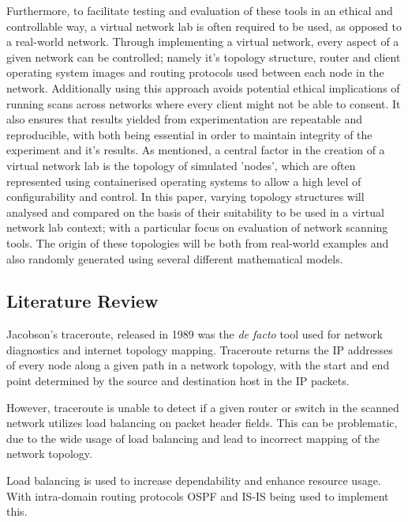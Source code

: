 Furthermore, to facilitate testing and evaluation of these tools in an ethical and controllable way, a virtual network lab is often required to be used, as opposed to a real-world network. Through implementing a virtual network, every aspect of a given network can be controlled; namely it's topology structure, router and client operating system images and routing protocols used between each node in the network. Additionally using this approach avoids potential ethical implications of running scans across networks where every client might not be able to consent. It also ensures that results yielded from experimentation are repeatable and reproducible, with both being essential in order to maintain integrity of the experiment and it's results. As mentioned, a central factor in the creation of a virtual network lab is the topology of simulated 'nodes', which are often represented using containerised operating systems to allow a high level of configurability and control. In this paper, varying topology structures will analysed and compared on the basis of their suitability to be used in a virtual network lab context; with a particular focus on evaluation of network scanning tools. The origin of these topologies will be both from real-world examples and also randomly generated using several different mathematical models. 

\subsection{Literature Review}

Jacobson's traceroute, released in 1989 was the \textit{de facto} tool used for network diagnostics and internet topology mapping.
Traceroute returns the IP addresses of every node along a given path in a network topology, with the start and end point determined by the source and destination host in the IP packets.\cite{jacobson1989traceroute}

However, traceroute is unable to detect if a given router or switch in the scanned network utilizes load balancing on packet header fields. This can be problematic, due to the wide usage of load balancing and lead to incorrect mapping of the network topology.\cite{anomalies}\cite{exhaustive}

Load balancing is used to increase dependability and enhance resource usage. With intra-domain routing protocols OSPF\cite{moyospf} and IS-IS\cite{isis} being used to implement this. 

